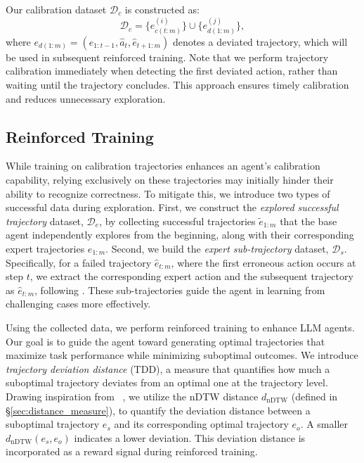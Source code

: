 Our calibration dataset $\mathcal{D}_c$ is constructed as:
\begin{equation}
    \mathcal{D}_c = \{e_{c(t:m)}^{(i)}\} \cup \{e_{d(1:m)}^{(j)}\},
\end{equation}
where $e_{d(1:m)}=(e_{1:t-1}, \hat{a}_t, \hat{e}_{t+1:m})$ denotes a deviated trajectory, which will be used in subsequent reinforced training.
Note that we perform trajectory calibration immediately when detecting the first deviated action, rather than waiting until the trajectory concludes. This approach ensures timely calibration and reduces unnecessary exploration.


\subsection{Reinforced Training}
\label{sec3.3}

While training on calibration trajectories enhances an agent's calibration capability, relying exclusively on these trajectories may initially hinder their ability to recognize correctness. To mitigate this, we introduce two types of successful data during exploration.
First, we construct the \textit{explored successful trajectory} dataset, $\mathcal{D}_e$, by collecting successful trajectories $\tilde{e}_{1:m}$ that the base agent independently explores from the beginning, along with their corresponding expert trajectories $e_{1:m}$.
Second, we build the \textit{expert sub-trajectory} dataset, $\mathcal{D}_s$. Specifically, for a failed trajectory $\hat{e}_{t:m}$, where the first erroneous action occurs at step $t$, we extract the corresponding expert action and the subsequent trajectory as $\hat{e}_{t:m}$, following \citet{xiong2024watch}. These sub-trajectories guide the agent in learning from challenging cases more effectively.

Using the collected data, we perform reinforced training to enhance LLM agents. 
Our goal is to guide the agent toward generating optimal trajectories that maximize task performance while minimizing suboptimal outcomes. We introduce \textit{trajectory deviation distance} (TDD), a measure that quantifies how much a suboptimal trajectory deviates from an optimal one at the trajectory level. 
Drawing inspiration from ~\citet{xu2024flame}, we utilize the nDTW distance $d_{\text{nDTW}}$ (defined in \S\ref{sec:distance_measure}), to quantify the deviation distance between a suboptimal trajectory $e_s$ and its corresponding optimal trajectory $e_o$.
A smaller $d_{\text{nDTW}}(e_s,e_o)$ indicates a lower deviation. This deviation distance is incorporated as a reward signal during reinforced training.

